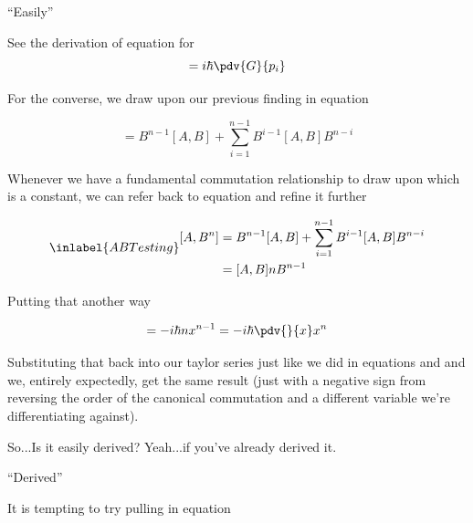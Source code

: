 \begin{answer}

  \begin{answerpart}{``Easily''}

    See the derivation of equation  for
    \begin{equation}
      [x_i, G(\vb{p})] = i\hbar \pdv{G}{p_i}
    \end{equation}


    For the converse, we draw upon our previous finding in equation

    \begin{equation}
      [A,B^n]
      =
      B^{n-1}[A,B]
      + \sum_{i=1}^{n-1}B^{i-1}[A,B]B^{n-i}
    \end{equation}

    Whenever we have a fundamental commutation relationship to draw
    upon which is a constant, we can refer back to equation
     and refine it further

    \begin{equation}
      \inlabel{ABTesting}
      \begin{split}
        [A,B^n]
        &=
        B^{n-1}[A,B]
        + \sum_{i=1}^{n-1}B^{i-1}[A,B]B^{n-i}
        \\
        &=
        [A,B]nB^{n-1}
        \\
      \end{split}
    \end{equation}

    Putting that another way

    \begin{equation}
      [p, x^n] = -i\hbar n x^{n-1} = -i\hbar \pdv{}{x} x^n
    \end{equation}

    Substituting that back into our taylor series just like we did in
    equations  and  and
    we, entirely expectedly, get the same result (just with a negative
    sign from reversing the order of the canonical commutation and a
    different variable we're differentiating against).

    So...Is it easily derived?  Yeah...if you've already derived it.
  \end{answerpart}

  \begin{answerpart}{``Derived''}

    It is tempting to try pulling in equation 


\end{answerpart}
\end{answer}
